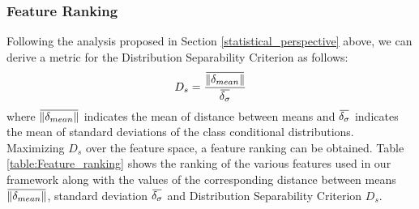 \documentclass[11pt,a4paper]{article}
\newcommand{\overbar}[1]{\mkern 1.5mu\overline{\mkern-1.5mu#1\mkern-1.5mu}\mkern 1.5mu}
\begin{document}
\subsubsection{Feature Ranking}\label{Section:feature_ranking}
Following the analysis proposed in Section \ref{statistical_perspective} above, we can derive a metric for the Distribution Separability Criterion as follows:
\begin{equation}
D_s = \frac{\overbar{\lVert \delta_{mean} \rVert }}{\overbar{\delta_{\sigma}}}
\end{equation}
where $\overbar{\lVert \delta_{mean} \rVert }$ indicates the mean of distance between means and $\overbar{\delta_{\sigma}}$ indicates the mean of standard deviations of the class conditional distributions. Maximizing $D_s$ over the feature space, a feature ranking can be obtained. Table \ref{table:Feature_ranking} shows the ranking of the various features used in our framework along with the values of the corresponding distance between means $\overbar{\lVert \delta_{mean} \rVert }$, standard deviation  $\overbar{\delta_{\sigma}}$ and Distribution Separability Criterion $D_s$.
\end{document}
